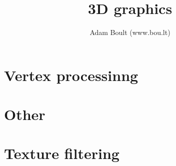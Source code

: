 \documentclass[oneside]{book}
\begin{document}
\author{Adam Boult (www.bou.lt)}
\title{3D graphics}
\maketitle

\setcounter{tocdepth}{0}
\tableofcontents



\part{Vertex processinng}



\part{Other}


\part{Texture filtering}

\end{document}
